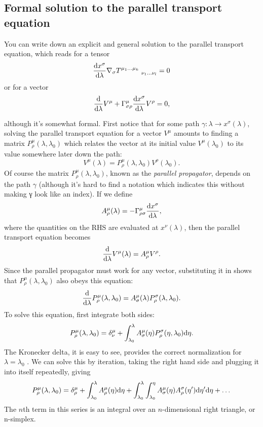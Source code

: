 \subsection{Formal solution to the parallel transport equation}
You can write down an explicit
and general solution to the parallel transport equation, which reads for a tensor
\begin{equation}
	\frac{\mathrm{d} x^\sigma}{\mathrm{d} \lambda} \nabla_\sigma T^{\mu_1 \dots \mu_k}_{\qquad \quad \nu_1 \dots \nu_l}=0
\end{equation}
or for a vector
\begin{equation}
	\frac{\mathrm{d} }{\mathrm{d} \lambda} V^\mu + \Gamma^\mu_{\sigma \rho} \frac{\mathrm{d} x^\sigma}{\mathrm{d} \lambda} V^\rho = 0,
\end{equation}

 although it’s somewhat formal. First
notice that for some path $γ : λ → x^σ (λ)$, solving the parallel transport equation for a vector
$V^\mu$ amounts to finding a matrix $P^μ_ρ (λ, λ_0 )$ which relates the vector at its initial value $V^μ (λ_0 )$
to its value somewhere later down the path:
\begin{equation}
	V^\mu (\lambda) = P^\mu_{\rho}(\lambda, \lambda_0) V^\rho (\lambda_0).
\end{equation}
Of course the matrix $P^μ_ρ (λ, λ_0 )$, known as the \emph{parallel propagator}, depends on the path
$γ$ (although it’s hard to find a notation which indicates this without making γ look like an
index). If we define
\begin{equation}
	A^\mu_\rho (\lambda) = -  \Gamma^\mu_{\rho \sigma} \frac{\mathrm{d} x^\sigma}{\mathrm{d} \lambda},
\end{equation}
where the quantities on the RHS are evaluated at $x^\nu(\lambda)$, then the parallel transport
equation becomes
\begin{equation}
	\frac{\mathrm{d}}{\mathrm{d} \lambda} V^\mu (\lambda) = A^\mu_\rho V^\rho.
\end{equation}
Since the parallel propagator must work for any vector, substituting it in shows
that $P^μ_ρ (λ, λ_0 )$ also obeys this equation:
\begin{equation}
	\frac{\mathrm{d}}{\mathrm{d} \lambda} P^\mu_\rho (\lambda, \lambda_0)= A^\mu_\sigma(\lambda) P^\sigma_\rho(\lambda,\lambda_0).
\end{equation}
To solve this equation, first integrate both sides:
\begin{equation}
P^\mu_\rho (\lambda,\lambda_0) = \delta^\mu_\nu + \int_{\lambda_0}^{\lambda} A^\mu_\sigma (\eta) P^\sigma_\rho(\eta, \lambda_0) \mathrm{d} \eta.
\end{equation}
The Kronecker delta, it is easy to see, provides the correct normalization for $λ = λ_0$ .
We can solve this by iteration, taking the right hand side and plugging it into itself
repeatedly, giving
\begin{equation}
	P^\mu_\rho(\lambda,\lambda_0) = \delta^\mu_\rho + \int_{\lambda_0}^{\lambda} A^\mu_\rho (\eta) \mathrm{d} \eta + \int_{\lambda_0}^\lambda  \int_{\lambda_0}^\eta A^\mu_\sigma(\eta) A^\sigma_\rho (\eta^\prime) \mathrm{d} \eta^\prime \mathrm{d} \eta + \dots 
\end{equation}
The $n$th term in this series is an integral over an $n$-dimensional right triangle, or n-simplex.


